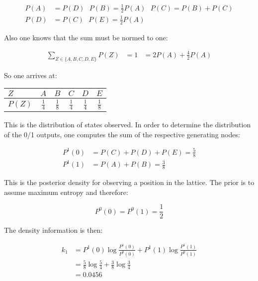 \documentclass[12pt]{scrartcl}
\begin{document}
\begin{equation}\begin{aligned}
P(A) &= P(D)\ \ \ P(B)=\frac{1}{2}P(A)\ \ \ P(C)=P(B) + P(C)\\
P(D) &= P(C)\ \ \ P(E) = \frac{1}{2}P(A)
\end{aligned}\end{equation}

Also one knows that the sum must be normed to one:

\begin{equation}\begin{aligned}
\sum_{Z\in\{A,B,C,D,E\}} P(Z) &= 1
&= 2 P(A) + \frac{4}{2} P(A)
\end{aligned}\end{equation}

So one arrives at:

\begin{table}[!h]
\centering
\begin{tabular}{l||c|c|c|c|c}
$Z$ & $A$ & $B$ & $C$ & $D$ & $E$\\ \hline
$P(Z)$ & $\frac{1}{4}$ & $\frac{1}{8}$ & $\frac{1}{4}$ & $\frac{1}{4}$ & $\frac{1}{8}$
\end{tabular}
\end{table}

This is the distribution of states observed. In order to determine the distribution of the 0/1 outputs, one computes the sum of the respective generating nodes:

\begin{equation}\begin{aligned}
P^1(0) &= P(C) + P(D) + P(E) = \frac{5}{8}\\
P^1(1) &= P(A) + P(B) = \frac{3}{8}
\end{aligned}\end{equation}

This is the posterior density for observing a position in the lattice. The prior is to assume maximum entropy and therefore:

\begin{equation}
P^0(0) = P^0(1) = \frac{1}{2}
\end{equation}

The density information is then:

\begin{equation}\begin{aligned}
k_1 &= P^1(0) \log \frac{P^1(0)}{P^0(0)} + P^1(1) \log \frac{P^1(1)}{P^0(1)}\\
&= \frac{5}{8} \log \frac{5}{4} + \frac{3}{8} \log \frac{3}{4}\\
& = 0.0456
\end{aligned}\end{equation}
\end{document}
